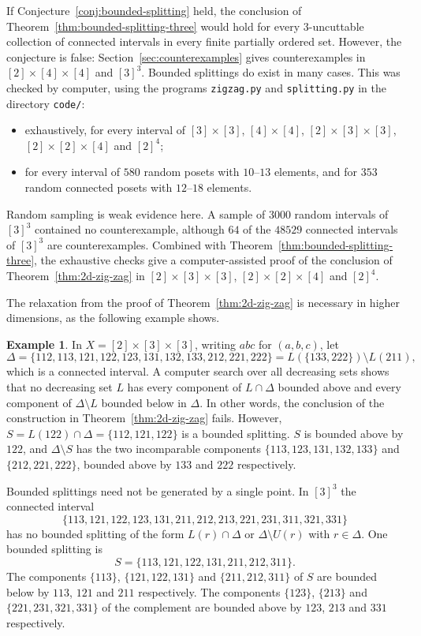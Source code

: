 \documentclass[10pt, a4paper]{article}
\theoremstyle{plain}
\theoremstyle{definition}
\newtheorem{example}[theorem]{Example}
\begin{document}
If Conjecture~\ref{conj:bounded-splitting} held, the conclusion of
Theorem~\ref{thm:bounded-splitting-three} would hold for every $3$-uncuttable
collection of connected intervals in every finite partially ordered set. However, the
conjecture is false: Section~\ref{sec:counterexamples} gives counterexamples in
$[2]\times[4]\times[4]$ and $[3]^3$. Bounded splittings do exist in many cases. This
was checked by computer, using the programs \texttt{zigzag.py} and
\texttt{splitting.py} in the directory \texttt{code/}:
\begin{itemize}
  \item exhaustively, for every interval of $[3]\times[3]$, $[4]\times[4]$,
    $[2]\times[3]\times[3]$, $[2]\times[2]\times[4]$ and $[2]^4$;
  \item for every interval of $580$ random posets with $10$--$13$ elements, and for
    $353$ random connected posets with $12$--$18$ elements.
\end{itemize}
Random sampling is weak evidence here. A sample of $3000$ random intervals of $[3]^3$
contained no counterexample, although $64$ of the $48529$ connected intervals of
$[3]^3$ are counterexamples.
Combined with Theorem~\ref{thm:bounded-splitting-three}, the exhaustive checks give a
computer-assisted proof of the conclusion of Theorem~\ref{thm:2d-zig-zag} in
$[2]\times[3]\times[3]$, $[2]\times[2]\times[4]$ and $[2]^4$.

The relaxation from the proof of Theorem~\ref{thm:2d-zig-zag} is necessary in higher
dimensions, as the following example shows.

\begin{example}\label{ex:no-strict-zig-zag}
  In $X=[2]\times[3]\times[3]$, writing $abc$ for $(a,b,c)$, let
  \[
    \Delta=\{112,113,121,122,123,131,132,133,212,221,222\}
          =L(\{133,222\})\setminus L(211),
  \]
  which is a connected interval. A computer search over all decreasing sets shows that
  no decreasing set $L$ has every component of $L\cap\Delta$ bounded above and every
  component of $\Delta\setminus L$ bounded below in $\Delta$. In other words,
  the conclusion of the construction in Theorem~\ref{thm:2d-zig-zag} fails. However,
  $S=L(122)\cap\Delta=\{112,121,122\}$ is a bounded splitting. $S$ is bounded above by
  $122$, and $\Delta\setminus S$ has the two incomparable components
  $\{113,123,131,132,133\}$ and $\{212,221,222\}$, bounded above by $133$ and $222$
  respectively.
\end{example}

Bounded splittings need not be generated by a single point. In $[3]^3$ the connected
interval
\[
  \{113,121,122,123,131,211,212,213,221,231,311,321,331\}
\]
has no bounded splitting of the form $L(r)\cap\Delta$ or $\Delta\setminus U(r)$ with
$r\in\Delta$. One bounded splitting is
\[
  S=\{113,121,122,131,211,212,311\}.
\]
The components $\{113\}$, $\{121,122,131\}$ and $\{211,212,311\}$ of $S$ are
bounded below by $113$, $121$ and $211$ respectively. The components $\{123\}$,
$\{213\}$ and $\{221,231,321,331\}$ of the complement are bounded above by $123$,
$213$ and $331$ respectively.
\end{document}

